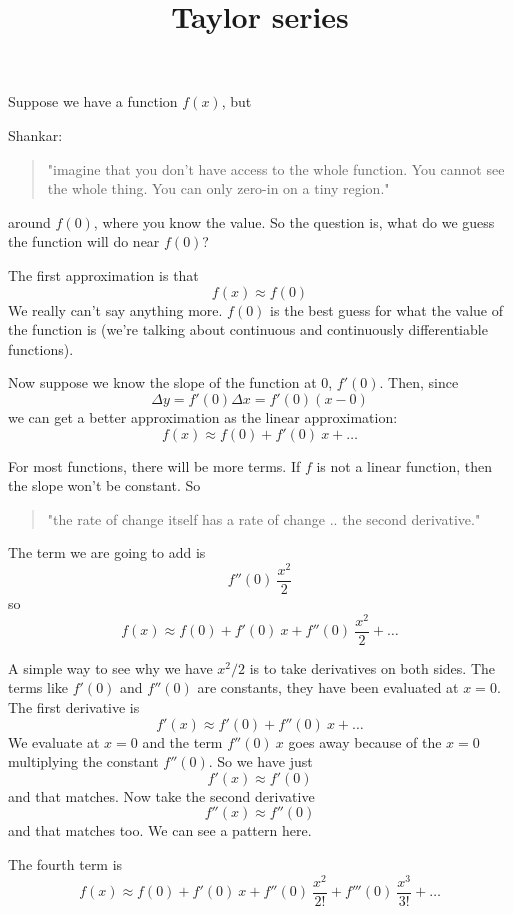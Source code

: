 \documentclass[11pt, oneside]{article}
\title{Taylor series}
\date{}
\begin{document}
\maketitle
\Large


Suppose we have a function $f(x)$, but 

Shankar:

\begin{quote}"imagine that you don't have access to the whole function.  You cannot see the whole thing.  You can only zero-in on a tiny region."\end{quote}

around $f(0)$, where you know the value.  So the question is, what do we guess the function will do near $f(0)$?  
 
The first approximation is that
\[ f(x) \approx f(0) \]
We really can't say anything more.  $f(0)$ is the best guess for what the value of the function is (we're talking about continuous and continuously differentiable functions).

Now suppose we know the slope of the function at $0$, $f'(0)$.  Then, since 
\[ \Delta y = f'(0) \Delta x = f'(0) (x - 0) \]
we can get a better approximation as the linear approximation:
\[ f(x) \approx f(0) + f'(0)\ x + \dots \]

For most functions, there will be more terms.  If $f$ is not a linear function, then the slope won't be constant.  So 

\begin{quote}"the rate of change itself has a rate of change .. the second derivative."\end{quote}  

The term we are going to add is
\[ f''(0)\ \frac{x^2}{2} \]
so
\[ f(x) \approx f(0) + f'(0)\ x + f''(0)\ \frac{x^2}{2}  + \dots \]

A simple way to see why we have $x^2/2$ is to take derivatives on both sides.  The terms like $f'(0)$ and $f''(0)$ are constants, they have been evaluated at $x=0$. The first derivative is
\[ f'(x) \approx  f'(0) + f''(0)\ x  + \dots \]
We evaluate at $x=0$ and the term $f''(0)\ x$ goes away because of the $x=0$ multiplying the constant $f''(0)$.  So we have just
\[ f'(x) \approx  f'(0)  \]
and that matches. Now take the second derivative
\[ f''(x) \approx  f''(0) \]
and that matches too.  We can see a pattern here.  

The fourth term is
\[ f(x) \approx f(0) + f'(0)\ x + f''(0)\ \frac{x^2}{2!}  + f'''(0)\ \frac{x^3}{3!} + \dots \]
\end{document}
